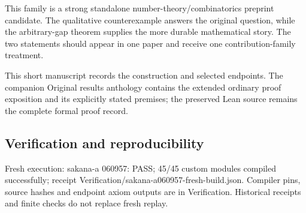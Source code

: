 \documentclass[11pt,a4paper]{article}
\begin{document}
This family is a strong standalone number-theory/combinatorics preprint candidate. The qualitative counterexample answers the original question, while the arbitrary-gap theorem supplies the more durable mathematical story. The two statements should appear in one paper and receive one contribution-family treatment.

{\small This short manuscript records the construction and selected endpoints. The companion Original results anthology contains the extended ordinary proof exposition and its explicitly stated premises; the preserved Lean source remains the complete formal proof record.\par}

\subsection{Verification and reproducibility}
Fresh execution: sakana-a 060957: PASS; 45/45 custom modules compiled successfully; receipt Verification/sakana-a060957-fresh-build.json. Compiler pins, source hashes and endpoint axiom outputs are in Verification. Historical receipts and finite checks do not replace fresh replay.
\end{document}
